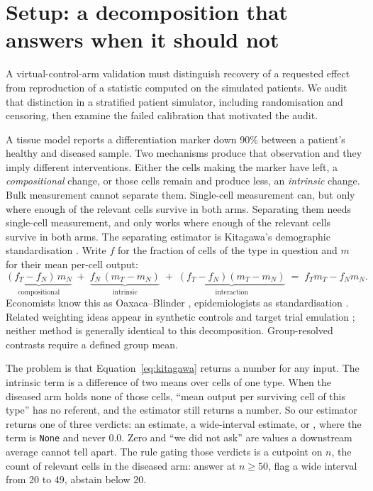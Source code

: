 \section{Setup: a decomposition that answers when it should not}
\label{sec:intro}

A virtual-control-arm validation must distinguish recovery of a requested effect
from reproduction of a statistic computed on the simulated patients. We audit
that distinction in a stratified patient simulator, including randomisation and
censoring, then examine the failed calibration that motivated the audit.

A tissue model reports a differentiation marker down 90\% between a patient's
healthy and diseased sample. Two mechanisms produce that observation and they
imply different interventions. Either the cells making the marker have left, a
\emph{compositional} change, or those cells remain and produce less, an
\emph{intrinsic} change.
\iffull
Bulk measurement cannot separate them. Single-cell
measurement can, but only where enough of the relevant cells survive in both
arms.
\else
Separating them needs single-cell measurement, and only works where enough of
the relevant cells survive in both arms.
\fi
The separating estimator is Kitagawa's demographic standardisation
\citep{kitagawa1955}. Write $f$ for the fraction of cells of the type in
question and $m$ for their mean per-cell output:
\begin{equation}
\underbrace{(f_T - f_N)\, m_N}_{\text{compositional}} \;+\;
\underbrace{f_N\, (m_T - m_N)}_{\text{intrinsic}} \;+\;
\underbrace{(f_T - f_N)(m_T - m_N)}_{\text{interaction}}
\;=\; f_T m_T - f_N m_N .
\label{eq:kitagawa}
\end{equation}
Economists know this as Oaxaca--Blinder \citep{oaxaca1973,blinder1973},
epidemiologists as standardisation \citep{kline2011}. Related weighting ideas appear in synthetic controls \citep{abadie2010} and
target trial emulation \citep{hernan2016}; neither method is generally identical
to this decomposition. Group-resolved contrasts require a defined group mean.

The problem is that Equation~\ref{eq:kitagawa} returns a number for any input.
The intrinsic term is a difference of two means over cells of one type. When the
diseased arm holds none of those cells, ``mean output per surviving cell of this
type'' has no referent, and the estimator still returns a number. So our
estimator returns one of three verdicts: an estimate, a wide-interval estimate,
or \notest{}, where the term is \texttt{None} and never $0.0$. Zero and ``we did
not ask'' are values a downstream average cannot tell apart. The rule gating
those verdicts is a cutpoint on $n$, the count of relevant cells in the diseased
arm: answer at $n \geq 50$, flag a wide interval from 20 to 49, abstain below 20.

